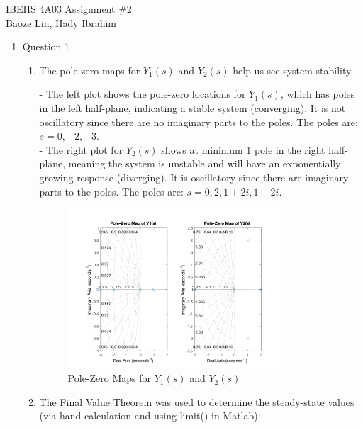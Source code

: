 \documentclass[12pt]{article}
\begin{document}
IBEHS 4A03 \hfill Assignment \#2\\
Baoze Lin, Hady Ibrahim

\hrulefill

\renewcommand{\theenumii}{\arabic{enumi}.\arabic{enumii}}

\begin{enumerate}
\item Question 1
  \begin{enumerate}
    \item
    The pole-zero maps for \( Y_1(s) \) and \( Y_2(s) \) help us see system stability. 

    - The left plot shows the pole-zero locations for \( Y_1(s) \), which has poles in the left half-plane, indicating a stable system (converging). It is not oscillatory since there are no imaginary parts to the poles. The poles are: $s=0, -2, -3$. \\
    - The right plot for \( Y_2(s) \) shows at minimum 1 pole in the right half-plane, meaning the system is unstable and will have an exponentially growing response (diverging). It is oscillatory since there are imaginary parts to the poles. The poles are: $s=0, 2, 1+2i, 1-2i$.

    \begin{figure}[H]
      \centering
      \includegraphics[width=0.8\textwidth]{Figures/figure1-1.png}
      \caption{Pole-Zero Maps for \( Y_1(s) \) and \( Y_2(s) \)}
      \label{fig:figure11} 
    \end{figure}

    \pagebreak
    \item
    The Final Value Theorem was used to determine the steady-state values (via hand calculation and using limit() in Matlab):


\end{enumerate}
\end{enumerate}
\end{document}
